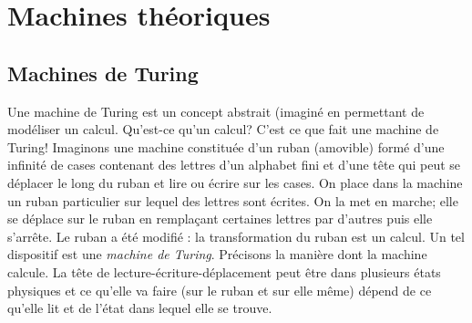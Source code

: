 




\section{Machines théoriques}
\subsection{Machines de Turing}
Une machine de Turing est un concept abstrait (imaginé en permettant de modéliser un calcul. Qu'est-ce qu'un calcul? C'est ce que fait une machine de Turing!\newline
Imaginons une machine constituée d'un ruban (amovible) formé d'une infinité de cases contenant des lettres d'un alphabet fini et d'une tête qui peut se déplacer le long du ruban et lire ou écrire sur les cases.\newline
On place dans la machine un ruban particulier sur lequel des lettres sont écrites. On la met en marche; elle se déplace sur le ruban en remplaçant certaines lettres par d'autres puis elle s'arrête. Le ruban a été modifié : la transformation du ruban est un \og calcul\fg. \newline
Un tel dispositif est une \emph{machine de Turing}. Précisons la manière dont la machine \og calcule\fg.\newline
La tête de lecture-écriture-déplacement peut être dans plusieurs états physiques et ce qu'elle va faire (sur le ruban et sur elle même) dépend de ce qu'elle lit et de l'état dans lequel elle se trouve. 

